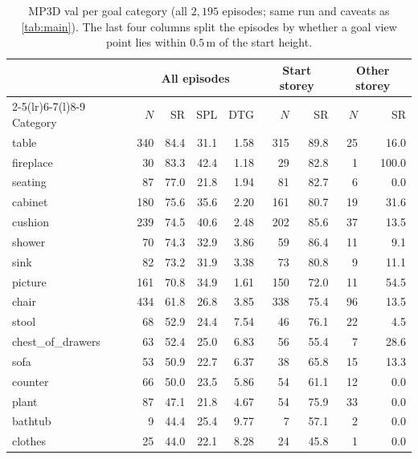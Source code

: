 \documentclass[10pt]{article}
\newcommand{\m}{\,\mathrm{m}}
\begin{document}
\begin{table}[t]
\centering
\caption{MP3D val per goal category (all $2{,}195$ episodes; same run and
caveats as \cref{tab:main}). The last four columns split the episodes by
whether a goal view point lies within $0.5\m$ of the start height.}
\label{tab:mp3d-cat}
\small
\setlength{\tabcolsep}{5pt}
\begin{tabular}{@{}lrrrr@{\hspace{14pt}}rrrr@{}}
\toprule
 & \multicolumn{4}{c}{All episodes} & \multicolumn{2}{c}{Start storey}
 & \multicolumn{2}{c}{Other storey} \\
\cmidrule(r){2-5}\cmidrule(lr){6-7}\cmidrule(l){8-9}
Category & $N$ & SR & SPL & DTG & $N$ & SR & $N$ & SR \\
\midrule
table              & 340 & 84.4 & 31.1 & 1.58  & 315 & 89.8 & 25 & 16.0 \\
fireplace          & 30  & 83.3 & 42.4 & 1.18  & 29  & 82.8 & 1  & 100.0 \\
seating            & 87  & 77.0 & 21.8 & 1.94  & 81  & 82.7 & 6  & 0.0 \\
cabinet            & 180 & 75.6 & 35.6 & 2.20  & 161 & 80.7 & 19 & 31.6 \\
cushion            & 239 & 74.5 & 40.6 & 2.48  & 202 & 85.6 & 37 & 13.5 \\
shower             & 70  & 74.3 & 32.9 & 3.86  & 59  & 86.4 & 11 & 9.1 \\
sink               & 82  & 73.2 & 31.9 & 3.38  & 73  & 80.8 & 9  & 11.1 \\
picture            & 161 & 70.8 & 34.9 & 1.61  & 150 & 72.0 & 11 & 54.5 \\
chair              & 434 & 61.8 & 26.8 & 3.85  & 338 & 75.4 & 96 & 13.5 \\
stool              & 68  & 52.9 & 24.4 & 7.54  & 46  & 76.1 & 22 & 4.5 \\
chest\_of\_drawers & 63  & 52.4 & 25.0 & 6.83  & 56  & 55.4 & 7  & 28.6 \\
sofa               & 53  & 50.9 & 22.7 & 6.37  & 38  & 65.8 & 15 & 13.3 \\
counter            & 66  & 50.0 & 23.5 & 5.86  & 54  & 61.1 & 12 & 0.0 \\
plant              & 87  & 47.1 & 21.8 & 4.67  & 54  & 75.9 & 33 & 0.0 \\
bathtub            & 9   & 44.4 & 25.4 & 9.77  & 7   & 57.1 & 2  & 0.0 \\
clothes            & 25  & 44.0 & 22.1 & 8.28  & 24  & 45.8 & 1  & 0.0 \\

\end{tabular}
\end{table}
\end{document}

